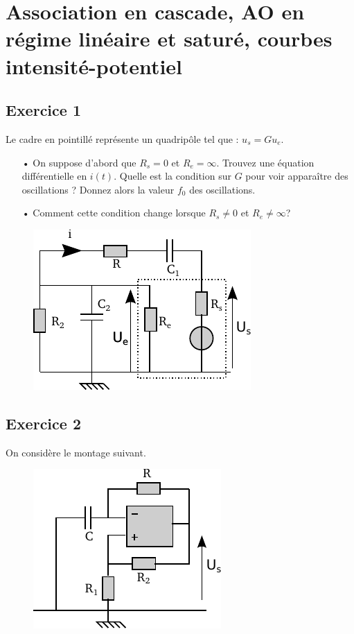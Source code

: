 \documentclass{report}
\begin{document}
\chapter*{Association en cascade, AO en régime linéaire et saturé, courbes intensité-potentiel}

\newpage

\section*{Exercice 1}

Le cadre en pointillé représente un quadripôle tel que : $u_{s}=Gu_{e}$.

\begin{itemize}

\item[•] On suppose d'abord que $R_{s}=0$ et $R_{e}=\infty$. Trouvez  une équation différentielle en $i(t)$. Quelle est la condition sur $G$ pour voir apparaître des oscillations ? Donnez alors la valeur $f_0$ des oscillations.

\item[•] Comment cette condition change lorsque $R_{s}\neq 0$ et $R_{e}\neq\infty$?

\end{itemize}

\begin{figure}[!h]
\centering
\includegraphics[width=0.5\linewidth]{circuit_5.pdf}
\end{figure}

\newpage

\section*{Exercice 2}

On considère le montage suivant.

\begin{figure}[!h]
\centering
\includegraphics[width=0.45\linewidth]{circuit_3.pdf}
\end{figure}
\end{document}
